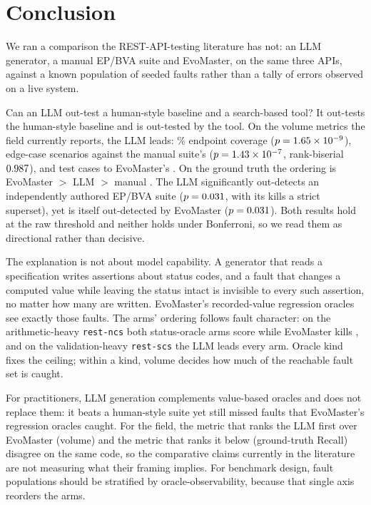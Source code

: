 \section{Conclusion}
\label{sec:conclusion}

We ran a comparison the REST-API-testing literature has not: an LLM generator, a manual EP/BVA
suite and EvoMaster, on the same three APIs, against a known population of \RQIIn{} seeded
faults rather than a tally of errors observed on a live system.

Can an LLM out-test a human-style baseline and a search-based tool? It out-tests the
human-style baseline and is out-tested by the tool. On the volume metrics the field currently
reports, the LLM leads: \RQIcoveragePct\% endpoint coverage ($p=1.65\times10^{-9}$),
\RQIIItotalLlm{} edge-case scenarios against the manual suite's \RQIIItotalManual{}
($p=1.43\times10^{-7}$, rank-biserial $0.987$), and \PDtestsLlm{} test cases to
EvoMaster's \PDtestsEvo{}. On the ground
truth the ordering is EvoMaster \RQIIrecallEvo{} $>$ LLM \RQIIrecallLlm{} $>$ manual
\RQIIrecallManual{}. The LLM significantly out-detects an independently authored EP/BVA suite
($p=0.031$, with its kills a strict superset), yet is itself out-detected by
EvoMaster ($p=0.031$). Both results hold at the raw threshold and neither holds under
Bonferroni, so we read them as directional rather than decisive.

The explanation is not about model capability. A generator that reads a specification writes
assertions about status codes, and a fault that changes a computed value while leaving the
status intact is invisible to every such assertion, no matter how many are written. EvoMaster's
recorded-value regression oracles see exactly those faults. The arms' ordering follows fault
character: on the arithmetic-heavy \texttt{rest-ncs} both status-oracle arms score
\RQIINcsLlm{} while EvoMaster kills \RQIINcsEvo{}, and on the validation-heavy
\texttt{rest-scs} the LLM leads every arm. Oracle kind fixes the ceiling; within a kind,
volume decides how much of the reachable fault set is caught.

For practitioners, LLM generation complements value-based oracles and does not replace them:
it beats a human-style suite yet still missed \RQIImcnemarLEc{} faults that EvoMaster's
regression oracles caught. For the field, the metric that ranks the LLM first over EvoMaster
(volume) and the metric that ranks it below (ground-truth Recall) disagree on the same code,
so the comparative claims currently in the literature are not measuring what their framing
implies. For benchmark design, fault populations should be stratified by
oracle-observability, because that single axis reorders the arms.

